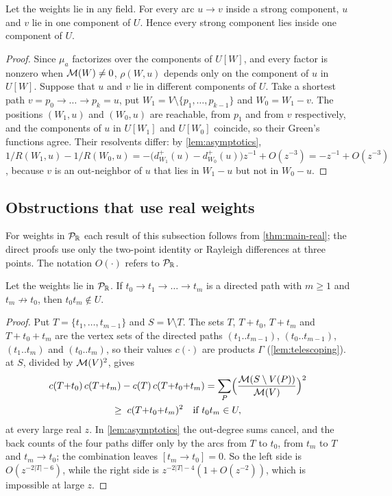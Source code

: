 \begin{theorem}[locality]\label{thm:locality}
Let the weights lie in any field. For every arc $u\to v$ inside a strong component, $u$ and $v$ lie in one component of $U$. Hence every strong component lies inside one component of $U$.
\end{theorem}
\begin{proof}
Since $\mu_a$ factorizes over the components of $U[W]$, and every factor is nonzero when $\mathcal{M}(W)\neq0$, $\rho(W,u)$ depends only on the component of $u$ in $U[W]$. Suppose that $u$ and $v$ lie in different components of $U$. Take a shortest path $v=p_0\to\dots\to p_k=u$, put $W_1=V\setminus\{p_1,\dots,p_{k-1}\}$ and $W_0=W_1-v$. The positions $(W_1,u)$ and $(W_0,u)$ are reachable, from $p_1$ and from $v$ respectively, and the components of $u$ in $U[W_1]$ and $U[W_0]$ coincide, so their Green's functions agree. Their resolvents differ: by \cref{lem:asymptotics}, $1/R(W_1,u)-1/R(W_0,u)=-\bigl(d^{+}_{W_1}(u)-d^{+}_{W_0}(u)\bigr)z^{-1}+O(z^{-3})=-z^{-1}+O(z^{-3})$, because $v$ is an out-neighbor of $u$ that lies in $W_1-u$ but not in $W_0-u$.
\end{proof}

\subsection{Obstructions that use real weights}
For weights in $\mathcal{P}_{\mathbb{R}}$ each result of this subsection follows from \cref{thm:main-real}; the direct proofs use only the two-point identity or Rayleigh differences at three points. The notation $O(\cdot)$ refers to $\mathcal{P}_{\mathbb{R}}$.

\begin{proposition}\label{prop:path-lemma}
Let the weights lie in $\mathcal{P}_{\mathbb{R}}$. If $t_0\to t_1\to\dots\to t_m$ is a directed path with $m\ge1$ and $t_m\not\to t_0$, then $t_0t_m\notin U$.
\end{proposition}
\begin{proof}
Put $T=\{t_1,\dots,t_{m-1}\}$ and $S=V\setminus T$. The sets $T$, $T+t_0$, $T+t_m$ and $T+t_0+t_m$ are the vertex sets of the directed paths $(t_1..t_{m-1})$, $(t_0..t_{m-1})$, $(t_1..t_m)$ and $(t_0..t_m)$, so their values $c(\cdot)$ are products $\Gamma$ (\cref{lem:telescoping}).  at $S$, divided by $\mathcal{M}(V)^2$, gives
\begin{multline*}
c(T{+}t_0)\,c(T{+}t_m)-c(T)\,c(T{+}t_0{+}t_m)=\sum_{P}\Bigl(\frac{\mathcal{M}(S\setminus V(P))}{\mathcal{M}(V)}\Bigr)^{2}\\
\ge\;c(T{+}t_0{+}t_m)^{2}\quad\text{if }t_0t_m\in U,
\end{multline*}
at every large real $z$. In \cref{lem:asymptotics} the out-degree sums cancel, and the back counts of the four paths differ only by the arcs from $T$ to $t_0$, from $t_m$ to $T$ and $t_m\to t_0$; the combination leaves $[t_m\to t_0]=0$. So the left side is $O(z^{-2|T|-6})$, while the right side is $z^{-2|T|-4}(1+O(z^{-2}))$, which is impossible at large $z$.
\end{proof}


